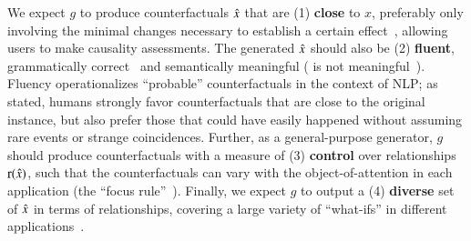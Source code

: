 We expect $g$ to produce counterfactuals $\hat{x}$ that are (1) \textbf{close} to $x$, preferably only involving the minimal changes necessary to establish a certain effect~\cite{pearl2018causal}, allowing users to make causality assessments.
The generated $\hat{x}$ should also be (2) \textbf{fluent}, \ie grammatically correct~\cite{morris2020textattack} and semantically meaningful (\eg {} is not meaningful~\cite{chomsky2002syntactic}).
Fluency operationalizes ``probable'' counterfactuals in the context of NLP;
as \citet{kahneman} stated, humans strongly favor counterfactuals that are close to the original instance, but also prefer those that could have easily happened without assuming rare events or strange coincidences.
Further, as a general-purpose generator, $g$ should produce counterfactuals with a measure of (3) \textbf{control} over relationships $\operatorname*{r}(\hat{x})$, such that the counterfactuals can vary with the object-of-attention in each application (the ``focus rule''~\cite{kahneman}).
Finally, %
we expect $g$ to output a (4) \textbf{diverse} set of $\hat{x}$ in terms of relationships, covering a large variety of ``what-ifs'' in different applications~\cite{pearl2018causal}.


